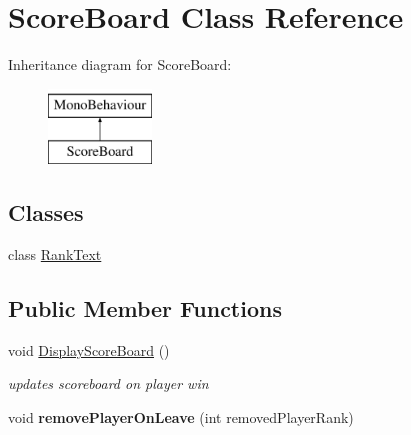 \hypertarget{class_score_board}{\section{Score\-Board Class Reference}
\label{class_score_board}
}
Inheritance diagram for Score\-Board\-:\begin{figure}[H]
\begin{center}
\leavevmode
\includegraphics[height=2.000000cm]{class_score_board}
\end{center}
\end{figure}
\subsection*{Classes}
\begin{DoxyCompactItemize}
\item 
class \hyperlink{class_score_board_1_1_rank_text}{Rank\-Text}
\end{DoxyCompactItemize}
\subsection*{Public Member Functions}
\begin{DoxyCompactItemize}
\item 
void \hyperlink{class_score_board_a67bd4682926000724ae01e01c3e79f66}{Display\-Score\-Board} ()
\begin{DoxyCompactList}\small\item\em updates scoreboard on player win \end{DoxyCompactList}\item 
\hypertarget{class_score_board_a57a28e82801b4f3ae149cd127a4cf05d}{void {\bfseries remove\-Player\-On\-Leave} (int removed\-Player\-Rank)}\label{class_score_board_a57a28e82801b4f3ae149cd127a4cf05d}

\end{DoxyCompactItemize}
